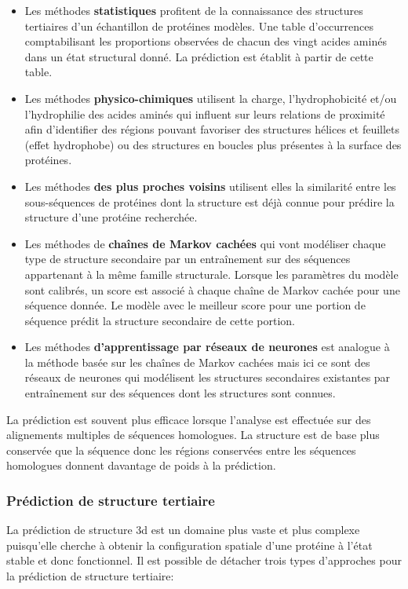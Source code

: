 \begin{itemize}
	\item Les méthodes \textbf{statistiques} profitent de la connaissance des structures tertiaires d'un échantillon de protéines modèles. Une table d'occurrences comptabilisant les proportions observées de chacun des vingt acides aminés dans un état structural donné. La prédiction est établit à partir de cette table.
	\item Les méthodes \textbf{physico-chimiques} utilisent la charge, l'hydrophobicité et/ou l'hydrophilie des acides aminés qui influent sur leurs relations de proximité afin d'identifier des régions pouvant favoriser des structures hélices et feuillets (effet hydrophobe) ou des structures en boucles plus présentes à la surface des protéines.
	\item Les méthodes \textbf{des plus proches voisins} utilisent elles la similarité entre les sous-séquences de protéines dont la structure est déjà connue pour prédire la structure d'une protéine recherchée.
	\item Les méthodes de \textbf{chaînes de Markov cachées} qui vont modéliser chaque type de structure secondaire par un entraînement sur des séquences appartenant à la même famille structurale. Lorsque les paramètres du modèle sont calibrés, un score est associé à chaque chaîne de Markov cachée pour une séquence donnée. Le modèle avec le meilleur score pour une portion de séquence prédit la structure secondaire de cette portion.
	\item Les méthodes \textbf{d'apprentissage par réseaux de neurones} est analogue à la méthode basée sur les chaînes de Markov cachées mais ici ce sont des réseaux de neurones qui modélisent les structures secondaires existantes par entraînement sur des séquences dont les structures sont connues.
\end{itemize}

La prédiction est souvent plus efficace lorsque l'analyse est effectuée sur des alignements multiples de séquences homologues. La structure est de base plus conservée que la séquence donc les régions conservées entre les séquences homologues donnent davantage de poids à la prédiction.

\subsubsection{Prédiction de structure tertiaire} 

La prédiction de structure 3d est un domaine plus vaste et plus complexe puisqu'elle cherche à obtenir la configuration spatiale d'une protéine à l'état stable et donc fonctionnel. Il est possible de détacher trois types d'approches pour la prédiction de structure tertiaire:

